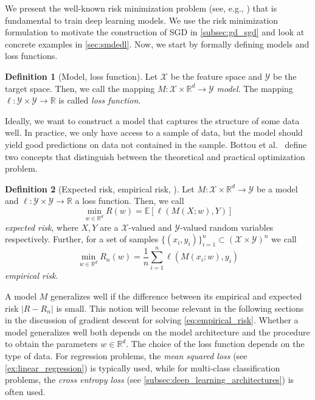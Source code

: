 \documentclass[12pt]{article}
\theoremstyle{definition}
\newtheorem{definition}[definition]{Definition}
\numberwithin{equation}{section}
\newcommand{\R}{\mathbb{R}}
\newcommand{\ev}[1]{\mathbb{E}\left[{#1}\right]}
\begin{document}
We present the well-known risk minimization problem (see, e.g., \cite{bottouOptimizationMethodsLargeScale2018}) that is fundamental to train deep learning models. We use the risk minimization formulation to motivate the construction of SGD in \autoref{subsec:gd_sgd} and look at concrete examples in \autoref{sec:smdedl}. Now, we start by formally defining models and loss functions.
\begin{definition}[Model, loss function]
  \label{def:model}
  Let $\mathcal{X}$ be the feature space and $\mathcal{Y}$ be the target space. Then, we call the mapping $M : \mathcal{X} \times \R^d \rightarrow \mathcal{Y}$ \emph{model}. The mapping $\ell : \mathcal{Y} \times \mathcal{Y} \rightarrow \R$ is called \emph{loss function}.
\end{definition}
Ideally, we want to construct a model that captures the structure of some data well. In practice, we only have access to a sample of data, but the model should yield good predictions on data not contained in the sample. Bottou et al.\ \cite{bottouOptimizationMethodsLargeScale2018} define two concepts that distinguish between the theoretical and practical optimization problem.
\begin{definition}[Expected risk, empirical risk, ]
  Let $M : \mathcal{X} \times \R^d \rightarrow \mathcal{Y}$ be a model and $\ell : \mathcal{Y} \times \mathcal{Y} \rightarrow \R$ a loss function. Then, we call
  \begin{equation}
  \min_{w \in \R^d} R(w) = \ev{\ell(M(X;w),Y)}
\end{equation}
\emph{expected risk}, where $X,Y$ are a $\mathcal{X}$-valued and $\mathcal{Y}$-valued random variables respectively. Further, for a set of samples $\{(x_i, y_i)\}_{i=1}^n \subset (\mathcal{X} \times  \mathcal{Y})^n$ we call
\begin{equation}
  \label{eq:empirical_risk}
  \min_{w \in \R^d}  R_n(w) = \frac{1}{n}\sum_{i=1}^n\ell(M(x_i;w),y_i)
\end{equation}
\emph{empirical risk}.
\end{definition}
A model $M$ generalizes well if the difference between its empirical and expected risk $|R - R_n|$ is small. This notion will become relevant in the following sections in the discussion of gradient descent for solving \eqref{eq:empirical_risk}. Whether a model generalizes well both depends on the model architecture and the procedure to obtain the parameters $w \in \R^d$. 
The choice of the loss function depends on the type of data. For regression problems, the \emph{mean squared loss} (see \autoref{ex:linear_regression}) is typically used, while for multi-class classification problems, the \emph{cross entropy loss} (see \autoref{subsec:deep_learning_architectures}) is often used.
\end{document}
